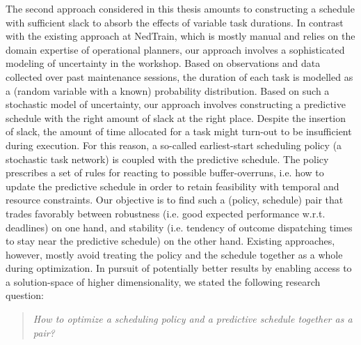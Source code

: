 	The second approach considered in this thesis amounts to constructing a schedule with sufficient slack to absorb the effects of variable task durations.
	In contrast with the existing approach at NedTrain, which is mostly manual and relies on the domain expertise of operational planners,
	our approach involves a sophisticated modeling of uncertainty in the workshop.
	Based on observations and data collected over past maintenance sessions,
	the duration of each task is modelled as a (random variable with a known) probability distribution.
	Based on such a stochastic model of uncertainty,
	our approach involves constructing a predictive schedule with the right amount of slack at the right place.
	Despite the insertion of slack,
	the amount of time allocated for a task might turn-out to be insufficient during execution.
	For this reason, a so-called earliest-start scheduling policy (a stochastic task network) is coupled with the predictive schedule.
	The policy prescribes a set of rules for reacting to possible buffer-overruns,
	i.e. how to update the predictive schedule in order to retain feasibility with temporal and resource constraints.
	Our objective is to find such a (policy, schedule) pair that trades favorably between robustness 
	(i.e. good expected performance w.r.t. deadlines) on one hand, 
	and stability (i.e. tendency of outcome dispatching times to stay near the predictive schedule) on the other hand.
	Existing approaches, however, mostly avoid treating the policy and the schedule together as a whole during optimization.
	In pursuit of potentially better results by enabling access to a solution-space of higher dimensionality,
	we stated the following research question:

	\begin{quote}
	\emph{How to optimize a scheduling policy and a predictive schedule together as a pair?}
	\end{quote}

